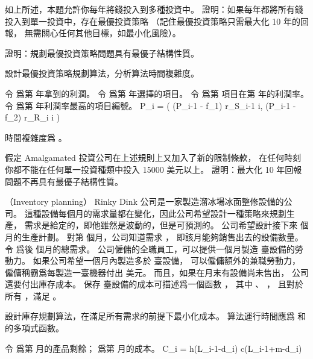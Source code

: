 \startigNum
\startitem
如上所述，本題允許你每年將錢投入到多種投資中。
證明：如果每年都將所有錢投入到單一投資中，存在最優投資策略
（記住最優投資策略只需最大化 10 年的回報，
無需關心任何其他目標，如最小化風險）。
\stopitem
\stopigNum

\startigNum[continue]
\startitem
證明：規劃最優投資策略問題具有最優子結構性質。
\stopitem
\stopigNum

\startigNum[continue]
\startitem
設計最優投資策略規劃算法，分析算法時間複雜度。
\stopitem
\stopigNum

\startANSWER
令  爲第  年拿到的利潤。
令  爲第  年選擇的項目。
令  爲第  項目在第  年的利潤率。
令  爲第  年利潤率最高的項目編號。
\startformula
P_i = \max(
(P_{i-1} - f_1) \times r_{S_{i-1} i},
(P_{i-1} - f_2) \times r_{R_i i}
)
\stopformula

時間複雜度爲 。
\stopANSWER

\startigNum[continue]
\startitem
假定 Amalgamated 投資公司在上述規則上又加入了新的限制條款，
在任何時刻你都不能在任何單一投資種類中投入 15000 美元以上。
證明：最大化 10 年回報問題不再具有最優子結構性質。
\stopitem
\stopigNum
\stopPROBLEM

\startPROBLEM
（Inventory planning）
Rinky Dink 公司是一家製造溜冰場冰面整修設備的公司。
這種設備每個月的需求量都在變化，因此公司希望設計一種策略來規劃生產，
需求是給定的，即他雖然是波動的，但是可預測的。
公司希望設計接下來  個月的生產計劃。
對第  個月，公司知道需求 ，
即該月能夠銷售出去的設備數量。
令  爲後  個月的總需求。
公司僱傭的全職員工，可以提供一個月製造  臺設備的勞動力。
如果公司希望一個月內製造多於  臺設備，
可以僱傭額外的兼職勞動力，
僱傭稱霸爲每製造一臺機器付出  美元。
而且，如果在月末有設備尚未售出，
公司還要付出庫存成本。
保存  臺設備的成本可描述爲一個函數 ，
其中 、 ，
且對於所有 ，滿足 。

設計庫存規劃算法，在滿足所有需求的前提下最小化成本。
算法運行時間應爲  和  的多項式函數。
\stopPROBLEM

\startANSWER
令  爲第  月的產品剩餘；  爲第  月的成本。
\startformula
C_i = \startcases
\NC h(L_{i-1}-d_i) \MC {} \NR
{} \MC {} \NR
\NC c\times (L_{i-1}+m-d_i) \MC {} \NR
\stopcases
\stopformula

